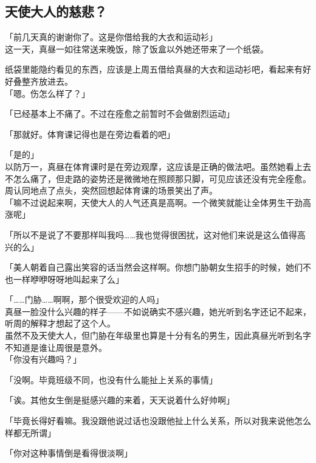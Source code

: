 \subsection{天使大人的慈悲？}

「前几天真的谢谢你了。这是你借给我的大衣和运动衫」\\

这一天，真昼一如往常送来晚饭，除了饭盒以外她还带来了一个纸袋。

纸袋里能隐约看见的东西，应该是上周五借给真昼的大衣和运动衫吧，看起来有好好叠整齐放进去。\\

「嗯。伤怎么样了？」

「已经基本上不痛了。不过在痊愈之前暂时不会做剧烈运动」

「那就好。体育课记得也是在旁边看着的吧」

「是的」\\

以防万一，真昼在体育课时是在旁边观摩，这应该是正确的做法吧。虽然她看上去不怎么痛了，但走路的姿势还是微微地在照顾那只脚，可见应该还没有完全痊愈。\\

周认同地点了点头，突然回想起体育课的场景笑出了声。\\

「嘛不过说起来啊，天使大人的人气还真是高啊。一个微笑就能让全体男生干劲高涨呢」

「所以不是说了不要那样叫我吗……我也觉得很困扰，这对他们来说是这么值得高兴的么」

「美人朝着自己露出笑容的话当然会这样啊。你想门胁朝女生招手的时候，她们不也一样咿咿呀呀地叫起来了么」

「……门胁……啊啊，那个很受欢迎的人吗」\\

真昼一脸没什么兴趣的样子——不如说确实不感兴趣，她光听到名字还记不起来，听周的解释才想起了这个人。\\

虽然不及天使大人，但门胁在年级里也算是十分有名的男生，因此真昼光听到名字不知道是谁让周很是意外。\\

「你没有兴趣吗？」

「没啊。毕竟班级不同，也没有什么能扯上关系的事情」

「诶。其他女生倒是挺感兴趣的来着，天天说着什么好帅啊」

「毕竟长得好看嘛。我没跟他说过话也没跟他扯上什么关系，所以对我来说他怎么样都无所谓」

「你对这种事情倒是看得很淡啊」

